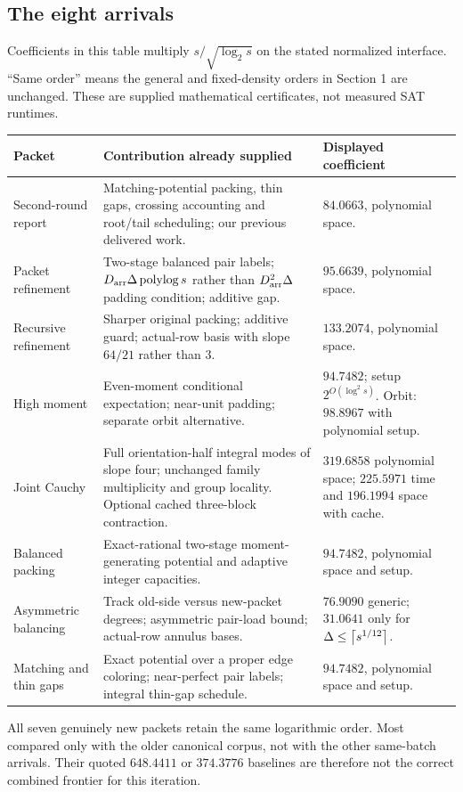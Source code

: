 \subsection{The eight arrivals}
Coefficients in this table multiply $s/\sqrt{\log_2s}$ on the stated normalized interface. ``Same order'' means the general and fixed-density orders in Section 1 are unchanged. These are supplied mathematical certificates, not measured SAT runtimes.
\begin{longtable}{@{}>{\raggedright\arraybackslash}p{}>{\raggedright\arraybackslash}p{}>{\raggedright\arraybackslash}p{}@{}}
\toprule
Packet & Contribution already supplied & Displayed coefficient\\\midrule\endhead
Second-round report & Matching-potential packing, thin gaps, crossing accounting and root/tail scheduling; our previous delivered work. & $84.0663$, polynomial space.\\[4pt]
Packet refinement & Two-stage balanced pair labels; $D_{\rm arr}\Delta\operatorname{polylog} s$ rather than $D_{\rm arr}^2\Delta$ padding condition; additive gap. & $95.6639$, polynomial space.\\[4pt]
Recursive refinement & Sharper original packing; additive guard; actual-row basis with slope $64/21$ rather than $3$. & $133.2074$, polynomial space.\\[4pt]
High moment & Even-moment conditional expectation; near-unit padding; separate orbit alternative. & $94.7482$; setup $2^{O(\log^2s)}$. Orbit: $98.8967$ with polynomial setup.\\[4pt]
Joint Cauchy & Full orientation-half integral modes of slope four; unchanged family multiplicity and group locality. Optional cached three-block contraction. & $319.6858$ polynomial space; $225.5971$ time and $196.1994$ space with cache.\\[4pt]
Balanced packing & Exact-rational two-stage moment-generating potential and adaptive integer capacities. & $94.7482$, polynomial space and setup.\\[4pt]
Asymmetric balancing & Track old-side versus new-packet degrees; asymmetric pair-load bound; actual-row annulus bases. & $76.9090$ generic; $31.0641$ only for $\Delta\le\left\lceil s^{1/12}\right\rceil$.\\[4pt]
Matching and thin gaps & Exact potential over a proper edge coloring; near-perfect pair labels; integral thin-gap schedule. & $94.7482$, polynomial space and setup.\\\bottomrule
\end{longtable}
All seven genuinely new packets retain the same logarithmic order. Most compared only with the older canonical corpus, not with the other same-batch arrivals. Their quoted $648.4411$ or $374.3776$ baselines are therefore not the correct combined frontier for this iteration.

